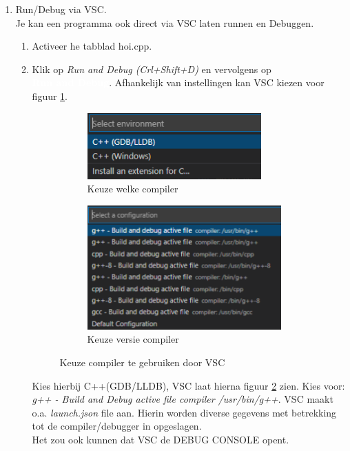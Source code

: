 \begin{enumerate}
     \item Run/Debug via VSC.\\
     Je kan een programma ook direct via VSC laten runnen en Debuggen.
     \begin{enumerate}
     	\item Activeer he tabblad hoi.cpp.
     	\item Klik op \textit{Run and Debug (Crl+Shift+D)}  en vervolgens op\\ \colorbox{NavyBlue}{\textcolor{White}{\textbf{Run and Debug}}}. Afhankelijk van instellingen kan VSC kiezen voor figuur \ref{fig:kzComp}. 
     \begin{figure}[h!]
     	\centering
     	\begin{center} 	
     		\begin{subfigure}[b]{0.44\textwidth}
     			\includegraphics[width=0.85\textwidth]{figuren/VSCksGDB}
     			\caption{Keuze welke compiler}
     			\label{fig:kzComp}
     		\end{subfigure}
     		\begin{subfigure}[b]{0.45\textwidth}
     			\includegraphics[width=0.95\textwidth]{figuren/VSCKsGcc}
     			\caption{Keuze versie compiler}
     			\label{fig:kzCompVer}
     		\end{subfigure}
     		\caption{Keuze compiler te gebruiken door VSC}
     		\label{fig:kzcompiler}   
     	\end{center}
     \end{figure}
   Kies hierbij C++(GDB/LLDB), VSC laat hierna figuur \ref{fig:kzCompVer} zien. Kies voor: \textit{g++ - Build and Debug active file \small{compiler /usr/bin/g++}}.
   VSC maakt o.a. \textit{launch.json} file aan. Hierin worden diverse gegevens met betrekking tot de compiler/debugger in opgeslagen. \\
   Het zou ook kunnen dat VSC de DEBUG CONSOLE opent. 
      

\end{enumerate}
\end{enumerate}
